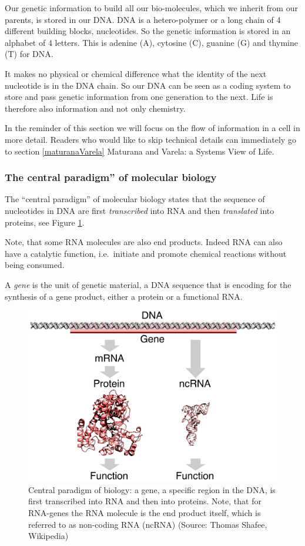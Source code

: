 \documentclass[
  11pt,
]{book}
\begin{document}
Our genetic information to build all our bio-molecules, which we inherit from our parents, is stored in our DNA. DNA is a hetero-polymer or a long chain of 4 different building blocks, nucleotides. So the genetic information is stored in an alphabet of 4 letters. This is
adenine (A), cytosine (C), guanine (G) and thymine (T) for DNA.

It makes no physical or chemical difference what the identity of the next nucleotide is in the DNA chain. So our DNA can be seen as a coding system to store and pass genetic information from one generation to the next. Life is therefore also information and not only chemistry.

In the reminder of this section we will focus on the flow of information in a cell in more detail. Readers who would like to skip technical details can immediately go to section \ref{maturanaVarela} Maturana and Varela: a Systems View of Life.

\hypertarget{the-central-paradigm-of-molecular-biology}{%
\subsubsection{The central paradigm'' of molecular biology}\label{the-central-paradigm-of-molecular-biology}}

The ``central paradigm'' of molecular biology states that the sequence of nucleotides in DNA are first \emph{transcribed} into RNA and then \emph{translated} into proteins, see Figure \ref{fig:centralParadigm}.

Note, that some RNA molecules are also end products. Indeed RNA can also have a catalytic function, i.e.~initiate and promote chemical reactions without being consumed.

A \emph{gene} is the unit of genetic material, a DNA sequence that is encoding for the synthesis of a gene product, either a protein or a functional RNA.

\begin{figure}

{\centering \includegraphics[width=0.5\linewidth]{./figs/gene} 

}

\caption{Central paradigm of biology: a gene, a specific region in the DNA, is first transcribed into RNA and then into proteins. Note, that for RNA-genes the RNA molecule is the end product itself, which is referred to as non-coding RNA (ncRNA) (Source: Thomas Shafee, Wikipedia)}\label{fig:centralParadigm}
\end{figure}
\end{document}
